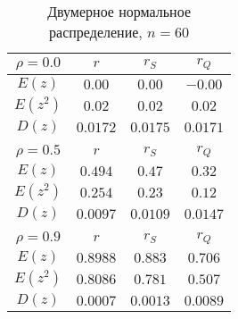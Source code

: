 \documentclass[12pt,a4paper]{article}
\begin{document}
\begin{center}
		\begin{table}[h!]
			\begin{center}
				\begin{tabular}{|c|c|c|c|}
					\hline
					$\rho=0.0$ & $r$ & $r_S$ & $r_Q$\\
					\hline
					$E(z)$ & $0.00$ & $0.00$ & $-0.00$\\
					\hline
					$E(z^2)$ & $0.02$ & $0.02$ & $0.02$\\
					\hline
					$D(z)$ & $0.0172$ & $0.0175$ & $0.0171$\\
					\hline
					\multicolumn{4}{c}{ } \\
					\hline
					$\rho=0.5$ & $r$ & $r_S$ & $r_Q$\\
					\hline
					$E(z)$ & $0.494$ & $0.47$ & $0.32$\\
					\hline
					$E(z^2)$ & $0.254$ & $0.23$ & $0.12$\\
					\hline
					$D(z)$ & $0.0097$ & $0.0109$ & $0.0147$\\
					\hline
					\multicolumn{4}{c}{ } \\
					\hline
					$\rho=0.9$ & $r$ & $r_S$ & $r_Q$\\
					\hline
					$E(z)$ & $0.8988$ & $0.883$ & $0.706$\\
					\hline
					$E(z^2)$ & $0.8086$ & $0.781$ & $0.507$\\
					\hline
					$D(z)$ & $0.0007$ & $0.0013$ & $0.0089$\\
					\hline					
				\end{tabular}
			\caption{Двумерное нормальное распределение, $n = 60$}
			\end{center}
		\end{table}
		

\end{center}
\end{document}
